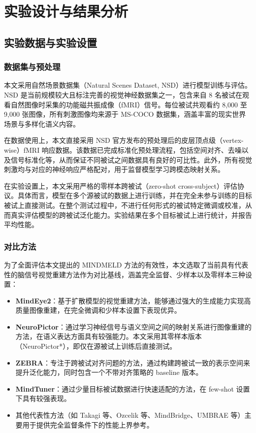 \chapter{实验设计与结果分析}


\section{实验数据与实验设置}

\subsection{数据集与预处理}

本文采用自然场景数据集（Natural Scenes Dataset, NSD）进行模型训练与评估。NSD 是当前规模较大且标注完善的视觉神经数据集之一，包含来自 8 名被试在观看自然图像时采集的功能磁共振成像（fMRI）信号。每位被试共观看约 8{,}000 至 9{,}000 张图像，所有刺激图像均来源于 MS-COCO 数据集，涵盖丰富的现实世界场景与多样化语义内容。

在数据使用上，本文直接采用 NSD 官方发布的预处理后的皮层顶点级（vertex-wise）fMRI 响应数据。该数据已完成标准化预处理流程，包括空间对齐、去噪以及信号标准化等，从而保证不同被试之间数据具有良好的可比性。此外，所有视觉刺激均与对应的神经响应严格配对，用于监督模型学习跨模态映射关系。

在实验设置上，本文采用严格的零样本跨被试（zero-shot cross-subject）评估协议。具体而言，模型在多个源被试的数据上进行训练，并在完全未参与训练的目标被试上直接测试。在整个测试过程中，不进行任何形式的被试特定微调或校准，从而真实评估模型的跨被试泛化能力。实验结果在多个目标被试上进行统计，并报告平均性能。

\subsection{对比方法}

为了全面评估本文提出的 MINDMELD 方法的有效性，本文选取了当前具有代表性的脑信号视觉重建方法作为对比基线，涵盖完全监督、少样本以及零样本三种设置：

\begin{itemize}
    \item \textbf{MindEye2}：基于扩散模型的视觉重建方法，能够通过强大的生成能力实现高质量图像重建，在完全微调和少样本设置下表现优异。

    \item \textbf{NeuroPictor}：通过学习神经信号与语义空间之间的映射关系进行图像重建的方法，在语义表达方面具有较强能力。本文采用其零样本版本（NeuroPictor*），即仅在源被试上训练后直接测试。

    \item \textbf{ZEBRA}：专注于跨被试对齐问题的方法，通过构建跨被试一致的表示空间来提升泛化能力，同时包含一个不带对齐策略的 baseline 版本。

    \item \textbf{MindTuner}：通过少量目标被试数据进行快速适配的方法，在 few-shot 设置下具有较强表现。

    \item 其他代表性方法（如 Takagi 等、Ozcelik 等、MindBridge、UMBRAE 等）主要用于提供完全监督条件下的性能上界参考。
\end{itemize}


